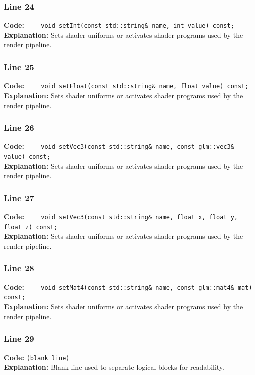 \documentclass[11pt,a4paper]{article}
\begin{document}
\subsubsection*{Line 24}
\textbf{Code:} \verb|    void setInt(const std::string& name, int value) const;|\\
\textbf{Explanation:} Sets shader uniforms or activates shader programs used by the render pipeline.

\subsubsection*{Line 25}
\textbf{Code:} \verb|    void setFloat(const std::string& name, float value) const;|\\
\textbf{Explanation:} Sets shader uniforms or activates shader programs used by the render pipeline.

\subsubsection*{Line 26}
\textbf{Code:} \verb|    void setVec3(const std::string& name, const glm::vec3& value) const;|\\
\textbf{Explanation:} Sets shader uniforms or activates shader programs used by the render pipeline.

\subsubsection*{Line 27}
\textbf{Code:} \verb|    void setVec3(const std::string& name, float x, float y, float z) const;|\\
\textbf{Explanation:} Sets shader uniforms or activates shader programs used by the render pipeline.

\subsubsection*{Line 28}
\textbf{Code:} \verb|    void setMat4(const std::string& name, const glm::mat4& mat) const;|\\
\textbf{Explanation:} Sets shader uniforms or activates shader programs used by the render pipeline.

\subsubsection*{Line 29}
\textbf{Code:} \texttt{(blank line)}\\
\textbf{Explanation:} Blank line used to separate logical blocks for readability.
\end{document}
